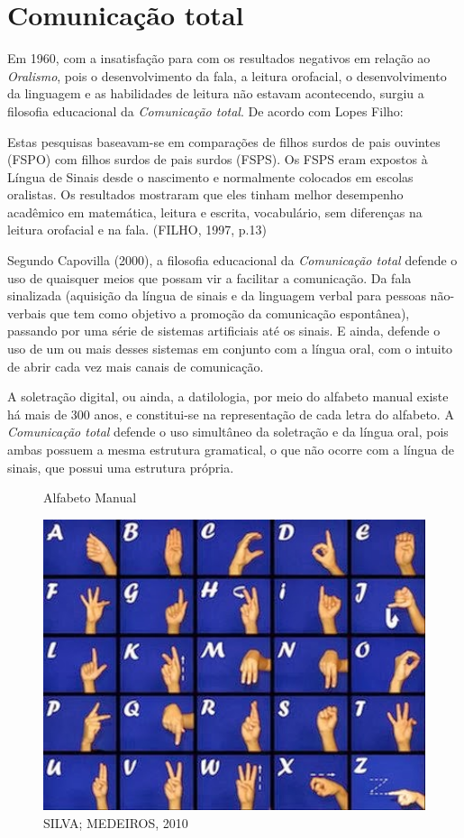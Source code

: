\documentclass[brasil]{abnt}
\begin{document}
		\section{Comunicação total}
		Em 1960, com a insatisfação para com os resultados negativos em relação ao \textit{Oralismo}, pois o desenvolvimento da fala, a leitura orofacial, o desenvolvimento da linguagem e as habilidades de 
		leitura não estavam acontecendo, surgiu a filosofia educacional da \textit{Comunicação total}. De acordo com Lopes Filho:
		
			\begin{citacao} Estas pesquisas baseavam-se em comparações de filhos surdos de pais ouvintes (FSPO) com filhos surdos de pais surdos (FSPS). Os FSPS eram expostos à Língua de Sinais desde o 
							nascimento e normalmente colocados em escolas oralistas. Os resultados mostraram que eles tinham melhor desempenho acadêmico em matemática, leitura e escrita, vocabulário, sem 
							diferenças na leitura orofacial e na fala. (FILHO, 1997, p.13)
			\end{citacao}
		  
		 Segundo Capovilla (2000), a filosofia educacional da \textit{Comunicação total} defende o uso de quaisquer meios que possam vir a facilitar a comunicação. Da fala sinalizada (aquisição da língua
		 de sinais e da linguagem verbal para pessoas não-verbais que tem como objetivo a promoção da comunicação espontânea), passando por uma série de sistemas artificiais até os sinais. E ainda, defende o uso de um 
		 ou mais desses sistemas em conjunto com a língua oral, com o intuito de abrir cada vez mais canais de comunicação.
		 
		 A soletração digital, ou ainda, a datilologia, por meio do alfabeto manual existe há mais de 300 anos, e constitui-se na representação de cada letra do alfabeto. 
		 A \textit{Comunicação total} defende o uso simultâneo da soletração e da língua oral, pois ambas possuem a mesma estrutura gramatical, o que não ocorre com a língua de sinais, que possui uma estrutura
		 própria.
		 
				\begin{figure}[!htb]
						\center
						\caption{Alfabeto Manual}
						\includegraphics[width=125mm]{dat.png}
						\caption{SILVA; MEDEIROS, 2010}
				\end{figure}
		 
\end{document}
